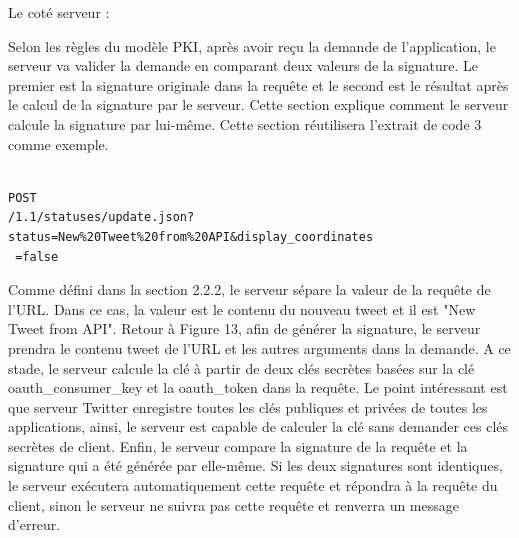 Le coté serveur : 

Selon les règles du modèle PKI, après avoir reçu la demande de l'application, le serveur va valider la demande en comparant deux valeurs de la signature. Le premier est la signature originale dans la requête et le second est le résultat après le calcul de la signature par le serveur. Cette section explique comment le serveur calcule la signature par lui-même. Cette section réutilisera l'extrait de code 3 comme exemple.


\begin{verbatim}

POST 
/1.1/statuses/update.json?status=New%20Tweet%20from%20API&display_coordinates
 =false
\end{verbatim}



Comme défini dans la section 2.2.2, le serveur sépare la valeur de la requête de l'URL. Dans ce cas, la valeur est le contenu du nouveau tweet et il est "New Tweet from API". Retour à Figure 13, afin de générer la signature, le serveur prendra le contenu tweet de l'URL et les autres arguments dans la demande. A ce stade, le serveur calcule la clé à partir de deux clés secrètes basées sur la clé oauth\_consumer\_key et la oauth\_token dans la requête. Le point intéressant est que serveur Twitter enregistre toutes les clés publiques et privées de toutes les applications, ainsi, le serveur est capable de calculer la clé sans demander ces clés secrètes de client. Enfin, le serveur compare la signature de la requête et la signature qui a été générée par elle-même. Si les deux signatures sont identiques, le serveur exécutera automatiquement cette requête et répondra à la requête du client, sinon le serveur ne suivra pas cette requête et renverra un message d'erreur.

